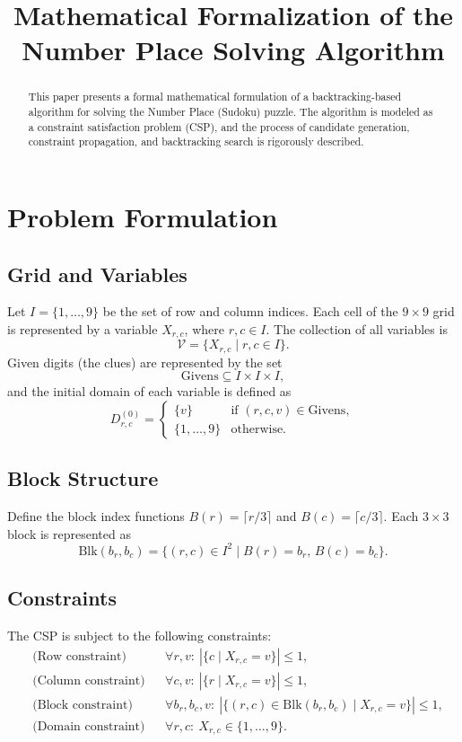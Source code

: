 \documentclass[a4paper,11pt]{article}
\title{Mathematical Formalization of the Number Place Solving Algorithm}
\author{}
\date{}
\begin{document}
\maketitle

\begin{abstract}
This paper presents a formal mathematical formulation of a backtracking-based algorithm for solving the Number Place (Sudoku) puzzle.
The algorithm is modeled as a constraint satisfaction problem (CSP), and the process of candidate generation, constraint propagation, and backtracking search is rigorously described.
\end{abstract}

\section{Problem Formulation}

\subsection{Grid and Variables}
Let \(I = \{1, \dots, 9\}\) be the set of row and column indices.
Each cell of the \(9 \times 9\) grid is represented by a variable \(X_{r,c}\), where \(r, c \in I\).
The collection of all variables is
\[
\mathcal{V} = \{ X_{r,c} \mid r, c \in I \}.
\]
Given digits (the clues) are represented by the set
\[
\mathrm{Givens} \subseteq I \times I \times I,
\]
and the initial domain of each variable is defined as
\[
D_{r,c}^{(0)} =
\begin{cases}
\{v\} & \text{if } (r,c,v) \in \mathrm{Givens},\\[4pt]
\{1, \dots, 9\} & \text{otherwise.}
\end{cases}
\]

\subsection{Block Structure}
Define the block index functions \(B(r) = \lceil r/3 \rceil\) and \(B(c) = \lceil c/3 \rceil\).
Each \(3 \times 3\) block is represented as
\[
\mathrm{Blk}(b_r,b_c) = \{ (r,c) \in I^2 \mid B(r)=b_r,\, B(c)=b_c \}.
\]

\subsection{Constraints}
The CSP is subject to the following constraints:
\begin{align*}
&\text{(Row constraint)}   && \forall r, v:\ |\{c \mid X_{r,c}=v\}| \le 1, \\
&\text{(Column constraint)}&& \forall c, v:\ |\{r \mid X_{r,c}=v\}| \le 1, \\
&\text{(Block constraint)} && \forall b_r,b_c,v:\ |\{(r,c)\in \mathrm{Blk}(b_r,b_c) \mid X_{r,c}=v\}| \le 1, \\
&\text{(Domain constraint)}&& \forall r,c:\ X_{r,c} \in \{1,\dots,9\}.
\end{align*}
\end{document}
